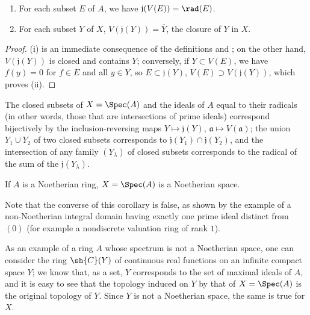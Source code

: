 \begin{proposition}[1.1.4]
\label{I.1.1.4}
\medskip\noindent
\begin{enumerate}
  \item[{\rm(i)}] For each subset $E$ of $A$, we have $\mathfrak{j}(V(E))=\rad(E)$.
  \item[{\rm(ii)}] For each subset $Y$ of $X$, $V(\mathfrak{j}(Y))=\overline{Y}$, the closure of $Y$ in $X$.
\end{enumerate}
\end{proposition}

\begin{proof}
(i) is an immediate consequence of the definitions and ;
on the other hand, $V(\mathfrak{j}(Y))$ is closed and contains $Y$;
conversely, if $Y\subset V(E)$, we have $f(y)=0$ for $f\in E$ and all $y\in Y$, so $E\subset\mathfrak{j}(Y)$, $V(E)\supset V(\mathfrak{j}(Y))$, which proves (ii).
\end{proof}

\begin{corollary}[1.1.5]
\label{I.1.1.5}
The closed subsets of $X=\Spec(A)$ and the ideals of $A$ equal to their radicals (in other words, those that are intersections of prime ideals) correspond bijectively by the inclusion-reversing maps $Y\mapsto\mathfrak{j}(Y)$, $\mathfrak{a}\mapsto V(\mathfrak{a})$;
the union $Y_1\cup Y_2$ of two closed subsets corresponds to $\mathfrak{j}(Y_1)\cap\mathfrak{j}(Y_2)$, and the intersection of any family $(Y_\lambda)$ of closed subsets corresponds to the radical of the sum of the $\mathfrak{j}(Y_\lambda)$.
\end{corollary}

\begin{corollary}[1.1.6]
\label{I.1.1.6}
If $A$ is a Noetherian ring, $X=\Spec(A)$ is a Noetherian space.
\end{corollary}

Note that the converse of this corollary is false, as shown by the example of a non-Noetherian integral domain having exactly one prime ideal distinct from $(0)$ (for example a nondiscrete valuation ring of rank $1$).

As an example of a ring $A$ whose spectrum is not a Noetherian space, one can consider the ring $\sh{C}(Y)$ of continuous real functions on an infinite compact space $Y$;
we know that, as a set, $Y$ corresponds to the set of maximal ideals of $A$, and it is easy to see that the topology induced on $Y$ by that of $X=\Spec(A)$ is the original topology of $Y$.
Since $Y$ is not a Noetherian space, the same is true for $X$.

